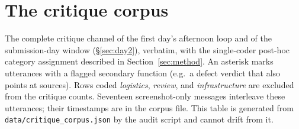 \documentclass[12pt]{article}
\begin{document}
\appendix
\section{The critique corpus}\label{app:corpus}

The complete critique channel of the first day's afternoon loop and of the submission-day window (\S\ref{sec:day2}), verbatim, with the single-coder post-hoc category assignment described in Section~\ref{sec:method}. An asterisk marks utterances with a flagged secondary function (e.g.\ a defect verdict that also points at sources). Rows coded \emph{logistics}, \emph{review}, and \emph{infrastructure} are excluded from the critique counts. Seventeen screenshot-only messages interleave these utterances; their timestamps are in the corpus file. This table is generated from \texttt{data/critique\_corpus.json} by the audit script and cannot drift from it.

\small

\normalsize
\end{document}
